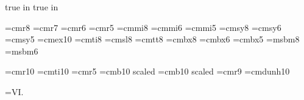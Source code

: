  true in
 true in



\font\eightrm=cmr8
\font\sevenrm=cmr7
\font\sixrm=cmr6
\font\fiverm=cmr5
\font\eighti=cmmi8
\font\sixi=cmmi6
\font\fivei=cmmi5
\font\eightsy=cmsy8
\font\sixsy=cmsy6
\font\fivesy=cmsy5
\font\tenex=cmex10
\font\eightit=cmti8
\font\eightsl=cmsl8
\font\eighttt=cmtt8
\font\eightbf=cmbx8
\font\sixbf=cmbx6
\font\fivebf=cmbx5
\font\eightmsb=msbm8
\font\sixmsb=msbm6

\def\eightpoint{\def\rm{\fam0\eightrm}%
\textfont0=\eightrm \scriptfont0=\sixrm 
\scriptscriptfont0=\fiverm
  \textfont1=\eighti \scriptfont1=\sixi 
\scriptscriptfont1=\fivei
  \textfont2=\eightsy \scriptfont2=\sixsy 
\scriptscriptfont2=\fivesy
  \textfont3=\tenex \scriptfont3=\tenex 
\scriptscriptfont3=\tenex
  \textfont\itfam=\eightit  \def\it{\fam\itfam\eightit}%
  \textfont\slfam=\eightsl  \def\sl{\fam\slfam\eightsl}%
  \textfont\ttfam=\eighttt  \def\tt{\fam\ttfam\eighttt}%
  \textfont\bffam=\eightbf  \scriptfont\bffam=\sixbf
 \scriptscriptfont\bffam=\fivebf  \def\bf{\fam\bffam\eightbf}%
  \normalbaselineskip=9pt
  \setbox\strutbox=\hbox{\vrule height7pt depth2pt width0pt}%
  \let\sc=\sixrm  \normalbaselines\rm}


\font\dotless=cmr10 %
\font\itdotless=cmti10
\def\itumi{{\"{\itdotless\char'020}}}
\def\itumj{{\"{\itdotless\char'021}}}
\def\umi{{\"{\dotless\char'020}}}
\def\umj{{\"{\dotless\char'021}}}
\font\smaller=cmr5
\font\boldtitlefont=cmb10 scaled
\font\smallboldtitle=cmb10 scaled 
\font\ninerm=cmr9
\font\dun=cmdunh10 %

\footline={\hfil {\tenrm VI.\folio}\hfil}

\def\eps{{\varepsilon}}
\def\Eps{{\varepsilon}}
\def\kap{{\kappa}}
\def\lam{{\lambda}}
\def\Lam{{\Lambda}}
\def\mynabla{{\nabla\!}}

\def\Bmu{{B_{\mu\nu}}}
\def\Gmu{{G_{\mu\nu}}}

\def\xdot{{\dot x}}
\def\xddot{{\ddot x}}

\def\undertext#1{$\underline{\vphantom{y}\hbox{#1}}$}
\def\nspace{\lineskip=1pt\baselineskip=12pt%
     \lineskiplimit=0pt}
\def\dspace{\lineskip=2pt\baselineskip=18pt%
     \lineskiplimit=0pt}

